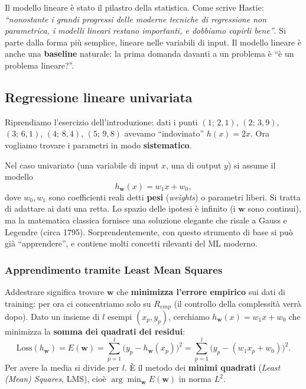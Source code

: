 Il modello lineare è stato il pilastro della statistica. Come scrive
Hastie: \emph{``nonostante i grandi progressi delle moderne tecniche di
regressione non parametrica, i modelli lineari restano importanti, e
dobbiamo capirli bene''}. Si parte dalla forma più semplice, lineare
nelle variabili di input. Il modello lineare è anche una
\textbf{baseline} naturale: la prima domanda davanti a un problema è ``è
un problema lineare?''.

\subsection{Regressione lineare
univariata}\label{regressione-lineare-univariata}

Riprendiamo l'esercizio dell'introduzione: dati i punti \((1;\,2{,}1)\),
\((2;\,3{,}9)\), \((3;\,6{,}1)\), \((4;\,8{,}4)\), \((5;\,9{,}8)\)
avevamo ``indovinato'' \(h(x) = 2x\). Ora vogliamo trovare i parametri
in modo \textbf{sistematico}.

Nel caso univariato (una variabile di input \(x\), una di output \(y\))
si assume il modello \[
h_\mathbf{w}(x) = w_1 x + w_0,
\] dove \(w_0, w_1\) sono coefficienti reali detti \textbf{pesi}
(\emph{weights}) o parametri liberi. Si tratta di adattare ai dati una
retta. Lo spazio delle ipotesi è infinito (i \(\mathbf{w}\) sono
continui), ma la matematica classica fornisce una soluzione elegante che
risale a Gauss e Legendre (circa 1795). Sorprendentemente, con questo
strumento di base si può già ``apprendere'', e contiene molti concetti
rilevanti del ML moderno.

\subsubsection{Apprendimento tramite Least Mean
Squares}\label{apprendimento-tramite-least-mean-squares}

Addestrare significa trovare \(\mathbf{w}\) che \textbf{minimizza
l'errore empirico} sui dati di training: per ora ci concentriamo solo su
\(R_{emp}\) (il controllo della complessità verrà dopo). Dato un insieme
di \(l\) esempi \((x_p, y_p)\), cerchiamo
\(h_\mathbf{w}(x) = w_1 x + w_0\) che minimizza la \textbf{somma dei
quadrati dei residui}: \[
\text{Loss}(h_\mathbf{w}) = E(\mathbf{w}) = \sum_{p=1}^{l} \big(y_p - h_\mathbf{w}(x_p)\big)^2 = \sum_{p=1}^{l} \big(y_p - (w_1 x_p + w_0)\big)^2.
\] Per avere la media si divide per \(l\). È il metodo dei
\textbf{minimi quadrati} (\emph{Least (Mean) Squares}, LMS), cioè
\(\arg\min_\mathbf{w} E(\mathbf{w})\) in norma \(L^2\).

